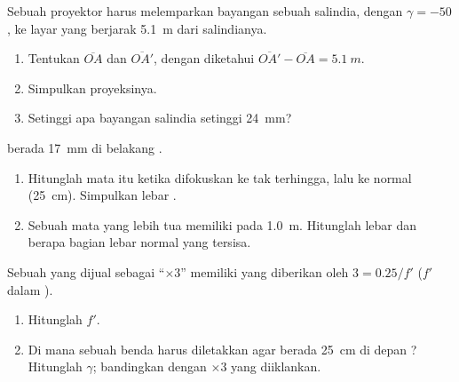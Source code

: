 \begin{exercise}[$\star\star\star$]\label{exo:g11:lenses-and-eye:12}
Sebuah proyektor harus melemparkan bayangan sebuah salindia, dengan
 $\gamma = -50$, ke layar yang berjarak \qty{5.1}{m} dari
salindianya.
\begin{enumerate}
  \item Tentukan $\overline{OA}$ dan $\overline{OA'}$, dengan diketahui
        $\overline{OA'} - \overline{OA} = \qty{5.1}{m}$.
  \item Simpulkan   proyeksinya.
  \item Setinggi apa bayangan salindia setinggi \qty{24}{mm}?
\end{enumerate}
\end{exercise}

\begin{exercise}[$\star\star\star$]\label{exo:g11:lenses-and-eye:13}
 berada \qty{17}{mm} di belakang .
\begin{enumerate}
  \item Hitunglah  mata itu ketika difokuskan ke tak
        terhingga, lalu ke  normal (\qty{25}{cm}).
        Simpulkan lebar  .
  \item Sebuah mata yang lebih tua memiliki  pada
        \qty{1.0}{m}. Hitunglah lebar  dan berapa bagian
        lebar  normal yang tersisa.
\end{enumerate}
\end{exercise}

\begin{exercise}[$\star\star\star$]\label{exo:g11:lenses-and-eye:14}
Sebuah  yang dijual sebagai ``$\times 3$'' memiliki  yang
diberikan oleh $3 = 0.25/f'$ ($f'$ dalam ).
\begin{enumerate}
  \item Hitunglah $f'$.
  \item Di mana sebuah benda harus diletakkan agar 
        berada \qty{25}{cm} di depan ? Hitunglah $\gamma$;
        bandingkan dengan $\times 3$ yang diiklankan.
\end{enumerate}
\end{exercise}

